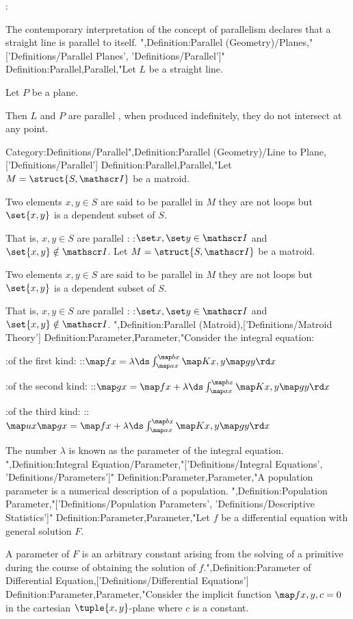 :


The contemporary interpretation of the concept of parallelism declares that a straight line is parallel to itself.
",Definition:Parallel (Geometry)/Planes,"['Definitions/Parallel Planes', 'Definitions/Parallel']"
Definition:Parallel,Parallel,"Let $L$ be a straight line.

Let $P$ be a plane.

Then $L$ and $P$ are parallel , when produced indefinitely, they do not intersect at any point.


Category:Definitions/Parallel",Definition:Parallel (Geometry)/Line to Plane,['Definitions/Parallel']
Definition:Parallel,Parallel,"Let $M = \struct {S, \mathscr I}$ be a matroid.


Two elements $x, y \in S$ are said to be parallel in $M$  they are not loops but $\set {x, y}$ is a dependent subset of $S$.


That is, $x, y \in S$ are parallel :
:$\set x, \set y \in \mathscr I$ and $\set {x, y} \notin \mathscr I$.
Let $M = \struct {S, \mathscr I}$ be a matroid.


Two elements $x, y \in S$ are said to be parallel in $M$  they are not loops but $\set {x, y}$ is a dependent subset of $S$.


That is, $x, y \in S$ are parallel :
:$\set x, \set y \in \mathscr I$ and $\set {x, y} \notin \mathscr I$.
",Definition:Parallel (Matroid),['Definitions/Matroid Theory']
Definition:Parameter,Parameter,"Consider the integral equation:

:of the first kind:
::$\map f x = \lambda \ds \int_{\map a x}^{\map b x} \map K {x, y} \map g y \rd x$

:of the second kind:
::$\map g x = \map f x + \lambda \ds \int_{\map a x}^{\map b x} \map K {x, y} \map g y \rd x$

:of the third kind:
::$\map u x \map g x = \map f x + \lambda \ds \int_{\map a x}^{\map b x} \map K {x, y} \map g y \rd x$


The number $\lambda$ is known as the parameter of the integral equation.
",Definition:Integral Equation/Parameter,"['Definitions/Integral Equations', 'Definitions/Parameters']"
Definition:Parameter,Parameter,"A population parameter is a numerical description of a population.
",Definition:Population Parameter,"['Definitions/Population Parameters', 'Definitions/Descriptive Statistics']"
Definition:Parameter,Parameter,"Let $f$ be a differential equation with general solution $F$.

A parameter of $F$ is an arbitrary constant arising from the solving of a primitive during the course of obtaining the solution of $f$.",Definition:Parameter of Differential Equation,['Definitions/Differential Equations']
Definition:Parameter,Parameter,"Consider the implicit function $\map f {x, y, c} = 0$ in the cartesian $\tuple {x, y}$-plane where $c$ is a constant.


